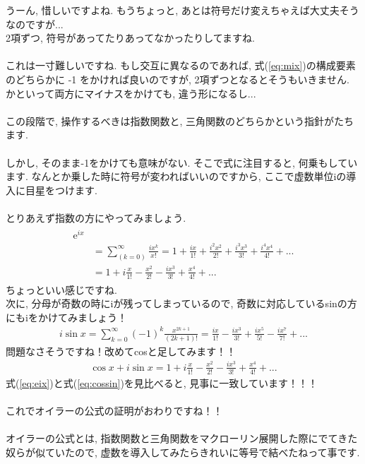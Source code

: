 \documentclass[11pt,a4paper]{jreport}
\begin{document}
うーん, 惜しいですよね. もうちょっと, あとは符号だけ変えちゃえば大丈夫そうなのですが...\\
2項ずつ, 符号があってたりあってなかったりしてますね.\\
\\
これは一寸難しいですね. もし交互に異なるのであれば, 式(\ref{eq:mix})の構成要素のどちらかに -1 をかければ良いのですが, 2項ずつとなるとそうもいきません. かといって両方にマイナスをかけても, 違う形になるし...\\
\\
この段階で, 操作するべきは指数関数と, 三角関数のどちらかという指針がたちます.\\
\\
しかし, そのまま-1をかけても意味がない. そこで式に注目すると, 何乗もしています. なんとか乗した時に符号が変わればいいのですから, ここで虚数単位iの導入に目星をつけます.\\
\\
とりあえず指数の方にやってみましょう.
\begin{eqnarray}
\begin{split}
\mathrm{e}^{ix} \\
& = \sum_{(k=0)}^\infty \frac{ix^k}{x!} = 1 + \frac{ix}{1!} + \frac{i^2x^2}{2!} + \frac{i^3x^3}{3!} + \frac{i^4x^4}{4!} + ...\\
& = 1 + i\frac{x}{1!} - \frac{x^2}{2!} - \frac{ix^3}{3!} + \frac{x^4}{4!} + ...
\label{eq:eix}
\end{split}
\end{eqnarray}
ちょっといい感じですね.\\
次に, 分母が奇数の時にiが残ってしまっているので, 奇数に対応しているsinの方にもiをかけてみましょう！\\
\begin{eqnarray}
i\sin x = \sum_{k=0}^{\infty}(-1)^k \frac{x^{2k + 1}}{(2k + 1)!} = \frac{ix}{1!} - \frac{ix^3}{3!} + \frac{ix^5}{5!} - \frac{ix^7}{7!} +  ...
\end{eqnarray}
問題なさそうですね！改めてcosと足してみます！！\\
\begin{eqnarray}
\cos x + i\sin x = 1 + i\frac{x}{1!} - \frac{x^2}{2!} - \frac{ix^3}{3!} + \frac{x^4}{4!} + ...
\label{eq:cossin}
\end{eqnarray}
式(\ref{eq:eix})と式(\ref{eq:cossin})を見比べると, 見事に一致しています！！！\\
\\
これでオイラーの公式の証明がおわりですね！！\\
\\
オイラーの公式とは, 指数関数と三角関数をマクローリン展開した際にでてきた奴らが似ていたので, 虚数を導入してみたらきれいに等号で結べたねって事です.\\
\end{document}

